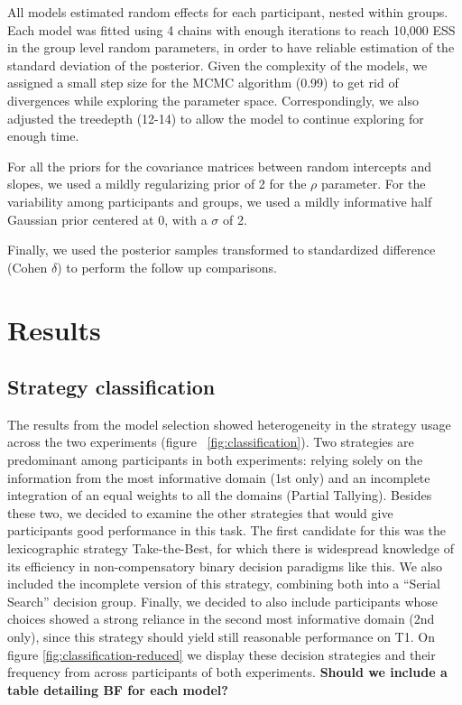 \documentclass[
  english,
  man]{apa6}
\begin{document}
All models estimated random effects for each participant, nested within groups. Each model was fitted using 4 chains with enough iterations to reach 10,000 ESS in the group level random parameters, in order to have reliable estimation of the standard deviation of the posterior. Given the complexity of the models, we assigned a small step size for the MCMC algorithm (0.99) to get rid of divergences while exploring the parameter space. Correspondingly, we also adjusted the treedepth (12-14) to allow the model to continue exploring for enough time.

For all the priors for the covariance matrices between random intercepts and slopes, we used a mildly regularizing prior of 2 for the \(\rho\) parameter. For the variability among participants and groups, we used a mildly informative half Gaussian prior centered at 0, with a \(\sigma\) of 2.

Finally, we used the posterior samples transformed to standardized difference (Cohen \(\delta\)) to perform the follow up comparisons.

\hypertarget{results}{%
\section{Results}\label{results}}

\hypertarget{strategy-classification}{%
\subsection{Strategy classification}\label{strategy-classification}}

The results from the model selection showed heterogeneity in the strategy usage across the two experiments (figure ~\ref{fig:classification}). Two strategies are predominant among participants in both experiments: relying solely on the information from the most informative domain (1st only) and an incomplete integration of an equal weights to all the domains (Partial Tallying). Besides these two, we decided to examine the other strategies that would give participants good performance in this task. The first candidate for this was the lexicographic strategy Take-the-Best, for which there is widespread knowledge of its efficiency in non-compensatory binary decision paradigms like this. We also included the incomplete version of this strategy, combining both into a ``Serial Search'' decision group. Finally, we decided to also include participants whose choices showed a strong reliance in the second most informative domain (2nd only), since this strategy should yield still reasonable performance on T1. On figure \ref{fig:classification-reduced} we display these decision strategies and their frequency from across participants of both experiments. \textbf{Should we include a table detailing BF for each model?}
\end{document}
